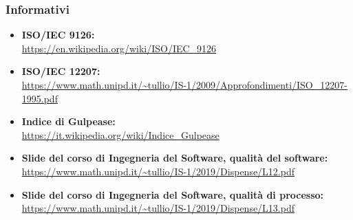 		\subsubsection{Informativi}
		\begin{itemize}
			\item \textbf{ISO/IEC 9126:}\\
			\url{https://en.wikipedia.org/wiki/ISO/IEC_9126}
			\item \textbf{ISO/IEC 12207:}\\
			\url{https://www.math.unipd.it/~tullio/IS-1/2009/Approfondimenti/ISO_12207-1995.pdf}
			\item \textbf{Indice di Gulpease:}\\
			\url{https://it.wikipedia.org/wiki/Indice_Gulpease}
			\item \textbf{Slide del corso di Ingegneria del Software, qualità del software:}\\
			\url{https://www.math.unipd.it/~tullio/IS-1/2019/Dispense/L12.pdf}
			\item \textbf{Slide del corso di Ingegneria del Software, qualità di processo:}\\
			\url{https://www.math.unipd.it/~tullio/IS-1/2019/Dispense/L13.pdf}
		
		\end{itemize}
	